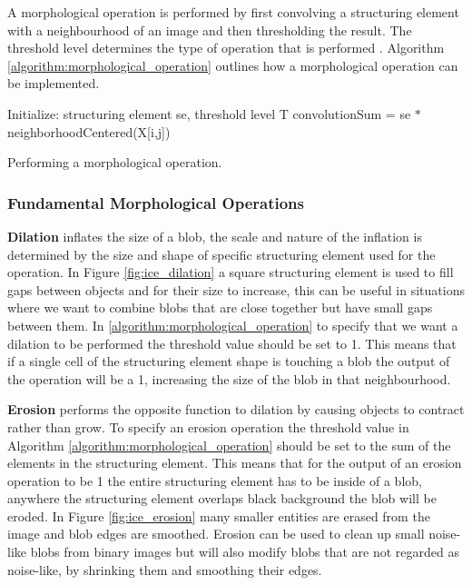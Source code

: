 A morphological operation is performed by first convolving a structuring element with a neighbourhood of an image and then thresholding the result. The threshold level determines the type of operation that is performed \cite{alg_apps}. Algorithm \ref{algorithm:morphological_operation} outlines how a morphological operation can be implemented.

\begin{algorithm}
\SetAlgoLined
{}
Initialize: structuring element se, threshold level T\;
{
    {
        convolutionSum = se $\ast$ neighborhoodCentered(X[i,j])\;
    }
}
\caption{Performing a morphological operation.}
\label{algorithm:morphological_operation}
\end{algorithm}

\subsubsection{Fundamental Morphological Operations}

\textbf{Dilation} inflates the size of a blob, the scale and nature of the inflation is determined by the size and shape of specific structuring element used for the operation. In Figure \ref{fig:ice_dilation} a square structuring element is used to fill gaps between objects and for their size to increase, this can be useful in situations where we want to combine blobs that are close together but have small gaps between them. In \ref{algorithm:morphological_operation} to specify that we want a dilation to be performed the threshold value should be set to 1. This means that if a single cell of the structuring element shape is touching a blob the output of the operation will be a 1, increasing the size of the blob in that neighbourhood. 

\textbf{Erosion} performs the opposite function to dilation by causing objects to contract rather than grow. To specify an erosion operation the threshold value in Algorithm \ref{algorithm:morphological_operation} should be set to the sum of the elements in the structuring element. This means that for the output of an erosion operation to be 1 the entire structuring element has to be inside of a blob, anywhere the structuring element overlaps black background the blob will be eroded. In Figure \ref{fig:ice_erosion} many smaller entities are erased from the image and blob edges are smoothed. Erosion can be used to clean up small noise-like blobs from binary images but will also modify blobs that are not regarded as noise-like, by shrinking them and smoothing their edges.

